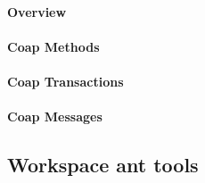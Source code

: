 \paragraph{Overview}

\paragraph{Coap Methods}

\paragraph{Coap Transactions}

\paragraph{Coap Messages}


\subsection{Workspace ant tools}




































